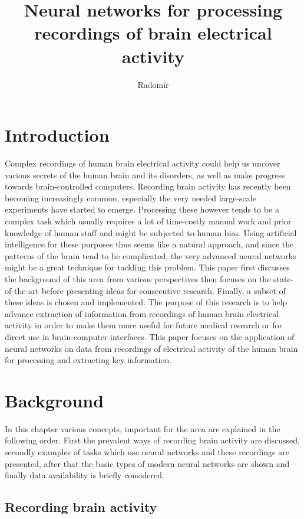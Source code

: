 \documentclass[english, he, bc, kiv, iso690alph]{fasthesis}
\author{Radomír}{Kesl}{}{}
\title{Neural networks for processing recordings of brain electrical activity}
\begin{document}
\frontpages[tm]
\tableofcontents


\chapter{Introduction}

Complex recordings of human brain electrical activity could help us uncover various secrets of the human brain and its disorders, as well as make progress towards brain-controlled computers.
Recording brain activity has recently been becoming increasingly common, especially the very needed large-scale experiments have started to emerge. Processing these however tends to be a complex task which usually requires a lot of time-costly manual work and prior knowledge of human staff and might be subjected to human bias. Using artificial intelligence for these purposes thus seems like a natural approach, and since the patterns of the brain tend to be complicated, the very advanced neural networks might be a great technique for tackling this problem.
This paper first discusses the background of this area from various perspectives then focuses on the state-of-the-art before presenting ideas for consecutive research. Finally, a subset of these ideas is chosen and implemented.
The purpose of this research is to help advance extraction of information from recordings of human brain electrical activity in order to make them more useful  for future medical research or for direct use in brain-computer interfaces.
This paper focuses on the application of neural networks on data from recordings of electrical activity of the human brain for processing and extracting key information.


\chapter{Background}

In this chapter various concepts, important for the area are explained in the following order. First the prevalent ways of recording brain activity are discussed, secondly examples of tasks which use neural networks and these recordings are presented, after that the basic types of modern neural networks are shown and finally data availability is briefly considered.

\section{Recording brain activity}
\end{document}
